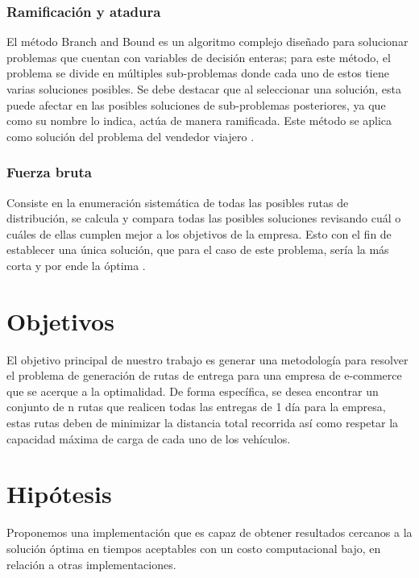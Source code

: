 \documentclass[journal]{IEEEtran}
\begin{document}
        \subsubsection{Ramificación y atadura}
        
            El método Branch and Bound es un algoritmo complejo diseñado para solucionar problemas que cuentan con variables de decisión enteras; para este método, el problema se divide en múltiples sub-problemas donde cada uno de estos tiene varias soluciones posibles. Se debe destacar que al seleccionar una solución, esta puede afectar en las posibles soluciones de sub-problemas posteriores, ya que como su nombre lo indica, actúa de manera ramificada. Este método se aplica como solución del problema del vendedor viajero \cite{trevelingProb}.

        \subsubsection{Fuerza bruta}
        
            Consiste en la enumeración sistemática de todas las posibles rutas de distribución, se calcula y compara todas las posibles soluciones revisando cuál o cuáles de ellas cumplen mejor a los objetivos de la empresa. Esto con el fin de establecer una única solución, que para el caso de este problema, sería la más corta y por ende la óptima \cite{trevelingProb}.
    
    \section{Objetivos}

        El objetivo principal de nuestro trabajo es generar una metodología para resolver el problema de generación de rutas de entrega para una empresa de e-commerce que se acerque a la optimalidad. De forma específica, se desea encontrar un conjunto de n rutas que realicen todas las entregas de 1 día para la empresa, estas rutas deben de minimizar la distancia total recorrida así como respetar la capacidad máxima de carga de cada uno de los vehículos.

    \section{Hipótesis} \label{sec:hyp}
            
        Proponemos una implementación que es capaz de obtener resultados cercanos a la solución óptima en tiempos aceptables con un costo computacional bajo, en relación a otras implementaciones. 
    
\end{document}
